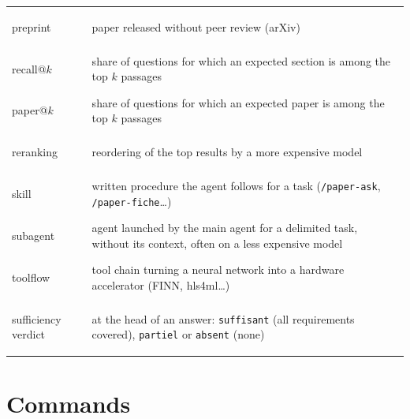 \documentclass[11pt,a4paper]{article}
\newcommand{\cmd}[1]{\texttt{#1}}
\begin{document}
\begin{center}
\begin{tabularx}{\linewidth}{@{}lL@{}}
\hypertarget{gl:preprint}{preprint} & paper released without peer review (arXiv) \\
\hypertarget{gl:recall}{recall@$k$} & share of questions for which an expected section is among the top $k$ passages \\
\hypertarget{gl:paperk}{paper@$k$} & share of questions for which an expected paper is among the top $k$ passages \\
\hypertarget{gl:reranking}{reranking} & reordering of the top results by a more expensive model \\
\hypertarget{gl:skill}{skill} & written procedure the agent follows for a task (\cmd{/paper-ask}, \cmd{/paper-fiche}\ldots) \\
\hypertarget{gl:sousagent}{subagent} & agent launched by the main agent for a delimited task, without its context, often on a less expensive model \\
\hypertarget{gl:toolflow}{toolflow} & tool chain turning a neural network into a hardware accelerator (FINN, hls4ml\ldots) \\
\hypertarget{gl:verdict}{sufficiency verdict} & at the head of an answer: \cmd{suffisant} (all requirements covered), \cmd{partiel} or \cmd{absent} (none) \\
\bottomrule
\end{tabularx}
\end{center}

\section{Commands}
\end{document}
